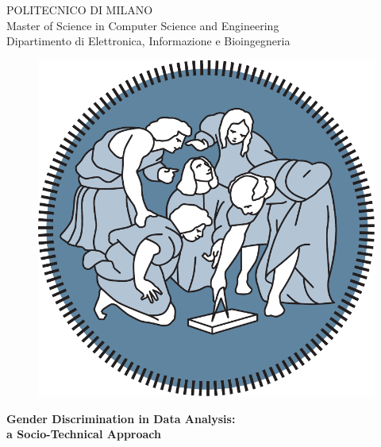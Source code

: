 \thispagestyle{empty}
\vspace*{-1.5cm}

\bfseries{
\begin{center}

\large
POLITECNICO DI MILANO\\
\normalsize
Master of Science in Computer Science and Engineering\\
Dipartimento di Elettronica, Informazione e Bioingegneria

 
\vspace{5mm}


\begin{figure}[h]
\begin{center}
\includegraphics[scale=.275]{logo_polimi.pdf}
\end{center}
\end{figure}

\vspace{1cm}
\LARGE
\textbf{Gender Discrimination in Data Analysis:\\a Socio-Technical Approach}\\



\end{center}}
